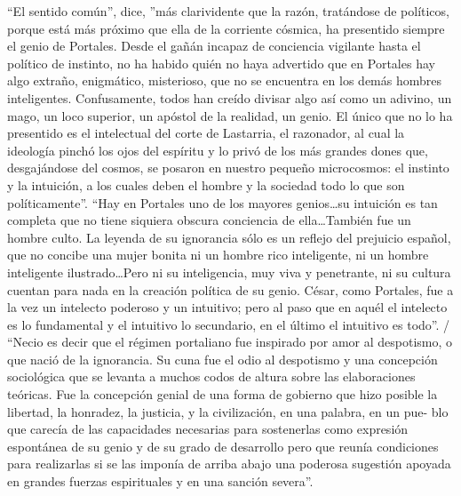 \documentclass[10pt,twoside,openright]{memoir}
\begin{document}
``El sentido común'', dice, ''más clarividente que la razón, tratándose de
políticos, porque está más próximo que ella de la corriente cósmica, ha
presentido siempre el genio de Portales. Desde el gañán incapaz de
conciencia vigilante hasta el político de instinto, no ha habido quién
no haya advertido que en Portales hay algo extraño, enigmático,
misterioso, que no se encuentra en los demás hombres inteligentes.
Confusamente, todos han creído divisar algo así como un adivino, un
mago, un loco superior, un apóstol de la realidad, un genio. El único
que no lo ha presentido es el intelectual del corte de Lastarria, el
razonador, al cual la ideología pinchó los ojos del espíritu y lo privó
de los más grandes dones que, desgajándose del cosmos, se posaron en
nuestro pequeño microcosmos: el instinto y la intuición, a los cuales
deben el hombre y la sociedad todo lo que son políticamente''. ``Hay en
Portales uno de los mayores genios\ldots su intuición es tan completa que
no tiene siquiera obscura conciencia de ella\ldots También fue un hombre
culto. La leyenda de su ignorancia sólo es un reflejo del prejuicio
español, que no concibe una mujer bonita ni un hombre rico inteligente,
ni un hombre inteligente ilustrado\ldots Pero ni su inteligencia, muy viva
y penetrante, ni su cultura cuentan para nada en la creación política de
su genio. César, como Portales, fue a la vez un intelecto poderoso y un
intuitivo; pero al paso que en aquél el intelecto es lo fundamental y el
intuitivo lo secundario, en el último el intuitivo es todo''. / ``Necio es
decir que el régimen portaliano fue inspirado por amor al despotismo, o
que nació de la ignorancia. Su cuna fue el odio al despotismo y una
concepción sociológica que se levanta a muchos codos de altura sobre las
elaboraciones teóricas. Fue la concepción genial de una forma de
gobierno que hizo posible la libertad, la honradez, la justicia, y la
civilización, en una palabra, en un pue- blo que carecía de las
capacidades necesarias para sostenerlas como expresión espontánea de su
genio y de su grado de desarrollo pero que reunía condiciones para
realizarlas si se las imponía de arriba abajo una poderosa sugestión
apoyada en grandes fuerzas espirituales y en una sanción severa''.
\end{document}

